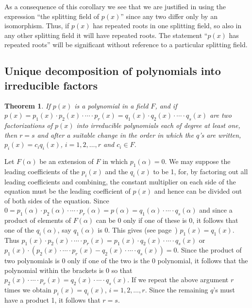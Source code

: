 \documentclass[10pt,leqno]{article}
\newtheorem{theo}{Theorem}
\theoremstyle{definition}
\begin{document}
As a consequence of this corollary we see that we are justified in using the expression ``the splitting field of $p(x)$'' since any two differ only by an isomorphism.
Thus, if $p(x)$ has repeated roots in one splitting field, so also in any other splitting field it will have repeated roots.
The statement ``$p(x)$ has repeated roots'' will be significant without reference to a particular splitting field.



\subsection{Unique decomposition of polynomials into irreducible factors}


\begin{theo}
\label{theo:onon}
If $p(x)$ is a polynomial in a field $F$, and if $p(x) = p_1(x) \cdot p_2(x) \cdot \cdots \cdot p_r(x) = q_1(x) \cdot q_2(x) \cdot \cdots \cdot q_s(x)$ are two factorizations of $p(x)$ into irreducible polynomials each of degree at least one, then $r = s$ and after a suitable change in the order in which the $q$'s are written, $p_i(x) = c_i q_i(x)$, $i = 1,2,\ldots,r$ and $c_i \in F$.
\end{theo}

Let $F(\alpha)$ be an extension of $F$ in which $p_1(\alpha) = 0$.
We may suppose the leading coefficients of the $p_i(x)$ and the $q_i(x)$ to be 1, for, by factoring out all leading coefficients and combining, the constant multiplier on each side of the equation must be the leading coefficient of $p(x)$ and hence can be divided out of both sides of the equation.
Since $0 = p_1(\alpha) \cdot p_2(\alpha) \cdot \cdots \cdot p_r(\alpha) = p(\alpha) = q_1(\alpha) \cdot \cdots \cdot q_s(\alpha)$ and since a product of elements of $F(\alpha)$ can be 0 only if one of these is 0, it follows that one of the $q_i(\alpha)$, say $q_1(\alpha)$ is 0.
This gives (see page~\pageref{p25}) $p_1(x) = q_1(x)$.
Thus $p_1(x) \cdot p_2(x) \cdot \cdots \cdot p_r(x) = p_1(x) \cdot q_2(x) \cdot \cdots \cdot q_s(x)$ or $p_1(x) \cdot (p_2(x) \cdot \cdots \cdot p_r(x) - q_2(x) \cdot \cdots \cdot q_s(x)) = 0$.
Since the product of two polynomials is $0$ only if one of the two is the $0$ polynomial, it follows that the polynomial within the brackets is 0 so that $p_2(x) \cdot \cdots \cdot p_r(x) = q_2(x) \cdot \cdots \cdot q_s(x)$.
If we repeat the above argument $r$ times we obtain $p_i(x) = q_i(x)$, $i = 1,2,\ldots, r$.
Since the remaining $q$'s must have a product 1, it follows that $r = s$.
\end{document}
